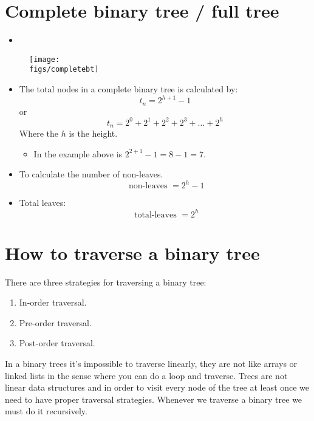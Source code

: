 \section{Complete binary tree / full tree}
\begin{itemize}
    \item {}
\end{itemize}
\begin{figure}[H]
    \centering
    \texttt{[image: \\figs/completebt]}
\end{figure}
\begin{itemize}
    \item The total nodes in a complete binary tree is calculated by: 
        \[
          t_n = 2^{h+1}-1
        \]
        or \[
          t_n = 2^0+2^1+2^2+2^3+\dots+2^h
        \]
        Where the $h$ is the height.
        \begin{itemize}
            \item In the example above is $2^{2+1}-1 = 8-1 = 7$.
        \end{itemize}
    \item To calculate the number of non-leaves.
        \[
          \text{ non-leaves } = 2^h-1
        \]
    
    \item Total leaves: 
        \[
          \text{ total-leaves }=2^h
        \]
\end{itemize}


\section{How to traverse a binary tree}
There are three strategies for traversing a binary tree:
\begin{enumerate}
    \item In-order traversal.
    \item Pre-order traversal.
    \item Post-order traversal.
\end{enumerate}
In a binary trees it's impossible to traverse linearly, they are not like arrays or linked lists in the sense where you can do a loop and traverse. Trees are not linear data structures and in order to visit every node of the tree at least once we need to have proper traversal strategies. Whenever we traverse a binary tree we must do it recursively. 

